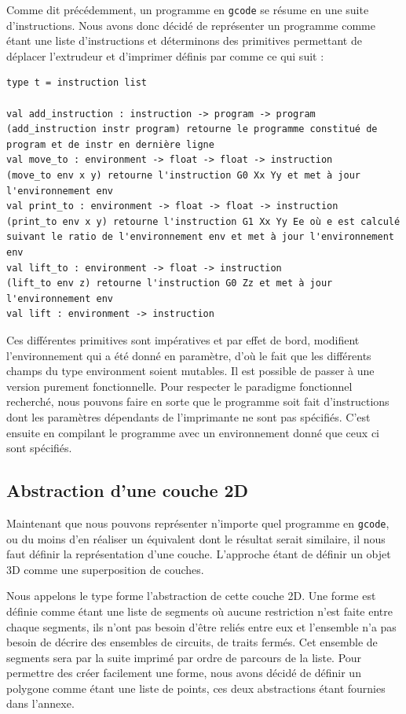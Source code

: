\documentclass[11pt, titlepage]{article}
\begin{document}
Comme dit précédemment, un programme en \verb&gcode& se résume en une suite d'instructions. Nous avons donc décidé de représenter un programme comme étant une liste d'instructions et déterminons des primitives permettant de déplacer l'extrudeur et d'imprimer définis par comme ce qui suit :

\begin{lstlisting}
type t = instruction list

val add_instruction : instruction -> program -> program
(add_instruction instr program) retourne le programme constitué de program et de instr en dernière ligne
val move_to : environment -> float -> float -> instruction
(move_to env x y) retourne l'instruction G0 Xx Yy et met à jour l'environnement env
val print_to : environment -> float -> float -> instruction  
(print_to env x y) retourne l'instruction G1 Xx Yy Ee où e est calculé suivant le ratio de l'environnement env et met à jour l'environnement env 
val lift_to : environment -> float -> instruction
(lift_to env z) retourne l'instruction G0 Zz et met à jour l'environnement env
val lift : environment -> instruction
\end{lstlisting}

Ces différentes primitives sont impératives et par effet de bord, modifient l'environnement qui a été donné en paramètre, d'où le fait que les différents champs du type environment soient mutables.
Il est possible de passer à une version purement fonctionnelle. Pour respecter le paradigme fonctionnel recherché, nous pouvons faire en sorte que le programme soit fait d'instructions dont les paramètres dépendants de l'imprimante ne sont pas spécifiés. C'est ensuite en compilant le programme avec un environnement donné que ceux ci sont spécifiés.

\subsection{Abstraction d'une couche 2D}
Maintenant que nous pouvons représenter n'importe quel programme en \verb&gcode&, ou du moins d'en réaliser un équivalent dont le résultat serait similaire, il nous faut définir la représentation d'une couche. L'approche étant de définir un objet 3D comme une superposition de couches.
\newline

Nous appelons le type forme l'abstraction de cette couche 2D.
Une forme est définie comme étant une liste de segments où aucune restriction n'est faite entre chaque segments, ils n'ont pas besoin d'être reliés entre eux et l'ensemble n'a pas besoin de décrire des ensembles de circuits, de traits fermés. Cet ensemble de segments sera par la suite imprimé par ordre de parcours de la liste.
Pour permettre des créer facilement une forme, nous avons décidé de définir un polygone comme étant une liste de points, ces deux abstractions étant fournies dans l'annexe.
\newline
\end{document}
